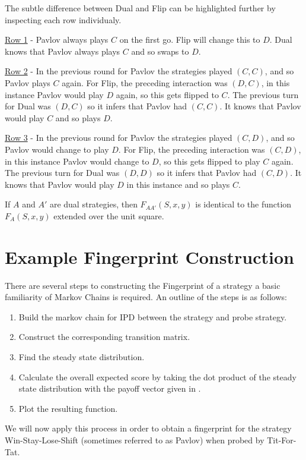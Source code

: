 The subtle difference between Dual and Flip can be highlighted further by inspecting each row individualy.

\underline{Row 1} - Pavlov always plays $C$ on the first go.
Flip will change this to $D$.
Dual knows that Pavlov always plays $C$ and so swaps to $D$.

\underline{Row 2} - In the previous round for Pavlov the strategies played $(C, C)$, and so Pavlov plays $C$ again.
For Flip, the preceding interaction was $(D, C)$, in this instance Pavlov would play $D$ again, so this gets flipped to $C$.
The previous turn for Dual was $(D, C)$ so it infers that Pavlov had $(C, C)$.
It knows that Pavlov would play $C$ and so plays $D$.

\underline{Row 3} - In the previous round for Pavlov the strategies played $(C, D)$, and so Pavlov would change to play $D$.
For Flip, the preceding interaction was $(C, D)$, in this instance Pavlov would change to $D$, so this gets flipped to play $C$ again.
The previous turn for Dual was $(D, D)$ so it infers that Pavlov had $(C, D)$.
It knows that Pavlov would play $D$ in this instance and so plays $C$.



\begin{theorem}\label{thm:fingerprint-unit-square}
If $A$ and $A'$ are dual strategies, then $F_{AA'}(S, x, y)$ is identical to the function $F_A(S, x, y)$ extended over the unit square.
\end{theorem}


\section{Example Fingerprint Construction}

There are several steps to constructing the Fingerprint of a strategy a basic familiarity of Markov Chains is required.
An outline of the steps is as follows:

\begin{enumerate}
    \item Build the markov chain for IPD between the strategy and probe strategy.
    \item Construct the corresponding transition matrix.
    \item Find the steady state distribution.
    \item Calculate the overall expected score by taking the dot product of the steady state distribution with the payoff vector given in .
    \item Plot the resulting function.
\end{enumerate}
{}
We will now apply this process in order to obtain a fingerprint for the strategy Win-Stay-Lose-Shift (sometimes referred to as Pavlov) when probed by Tit-For-Tat.

